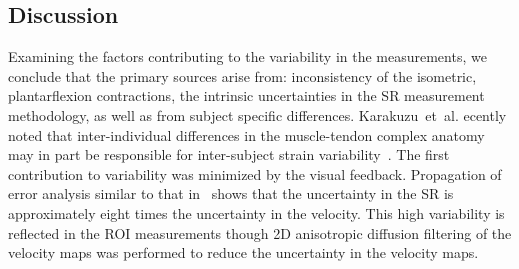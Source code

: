 %
%
%
%

\subsection{Discussion}
Examining the factors contributing to the variability in the measurements, we conclude that the primary sources arise from: inconsistency of the isometric, plantarflexion contractions, the intrinsic uncertainties in the SR measurement methodology, as well as from subject specific differences. 
Karakuzu~et~al. ecently noted that inter-individual differences in the muscle-tendon complex anatomy may in part be responsible for inter-subject strain variability~\cite{RNSS4}.
The first contribution to variability was minimized by the visual feedback.
Propagation of error analysis similar to that in~\cite{RNSS14} shows that the uncertainty in the SR is approximately eight times the uncertainty in the velocity.
This high variability is reflected in the ROI measurements though 2D anisotropic diffusion filtering of the velocity maps was performed to reduce the uncertainty in the velocity maps.

